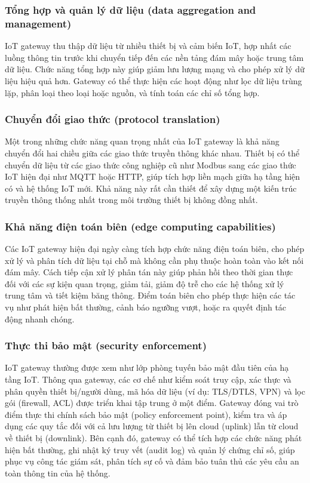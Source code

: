                 \subsubsection*{Tổng hợp và quản lý dữ liệu (data aggregation and management)}
                    IoT gateway thu thập dữ liệu từ nhiều thiết bị và cảm biến IoT, hợp nhất các luồng thông tin trước khi chuyển tiếp đến các nền tảng đám mây hoặc trung tâm dữ liệu. Chức năng tổng hợp này giúp giảm lưu lượng mạng và cho phép xử lý dữ liệu hiệu quả hơn. Gateway có thể thực hiện các hoạt động như lọc dữ liệu trùng lặp, phân loại theo loại hoặc nguồn, và tính toán các chỉ số tổng hợp.

                \subsubsection*{Chuyển đổi giao thức (protocol translation)}
                    Một trong những chức năng quan trọng nhất của IoT gateway là khả năng chuyển đổi hai chiều giữa các giao thức truyền thông khác nhau. Thiết bị có thể chuyển dữ liệu từ các giao thức công nghiệp cũ như Modbus sang các giao thức IoT hiện đại như MQTT hoặc HTTP, giúp tích hợp liền mạch giữa hạ tầng hiện có và hệ thống IoT mới. Khả năng này rất cần thiết để xây dựng một kiến trúc truyền thông thống nhất trong môi trường thiết bị không đồng nhất.

                \subsubsection*{Khả năng điện toán biên (edge computing capabilities)}
                    Các IoT gateway hiện đại ngày càng tích hợp chức năng điện toán biên, cho phép xử lý và phân tích dữ liệu tại chỗ mà không cần phụ thuộc hoàn toàn vào kết nối đám mây. Cách tiếp cận xử lý phân tán này giúp phản hồi theo thời gian thực đối với các sự kiện quan trọng, giảm tải, giảm độ trễ cho các hệ thống xử lý trung tâm và tiết kiệm băng thông. Điểm toán biên cho phép thực hiện các tác vụ như phát hiện bất thường, cảnh báo ngưỡng vượt, hoặc ra quyết định tác động nhanh chóng.

                \subsubsection*{Thực thi bảo mật (security enforcement)}
                    IoT gateway thường được xem như lớp phòng tuyến bảo mật đầu tiên của hạ tầng IoT. Thông qua gateway, các cơ chế như kiểm soát truy cập, xác thực và phân quyền thiết bị/người dùng, mã hóa dữ liệu (ví dụ: TLS/DTLS, VPN) và lọc gói (firewall, ACL) được triển khai tập trung ở một điểm. Gateway đóng vai trò điểm thực thi chính sách bảo mật (policy enforcement point), kiểm tra và áp dụng các quy tắc đối với cả lưu lượng từ thiết bị lên cloud (uplink) lẫn từ cloud về thiết bị (downlink). Bên cạnh đó, gateway có thể tích hợp các chức năng phát hiện bất thường, ghi nhật ký truy vết (audit log) và quản lý chứng chỉ số, giúp phục vụ công tác giám sát, phân tích sự cố và đảm bảo tuân thủ các yêu cầu an toàn thông tin của hệ thống.

